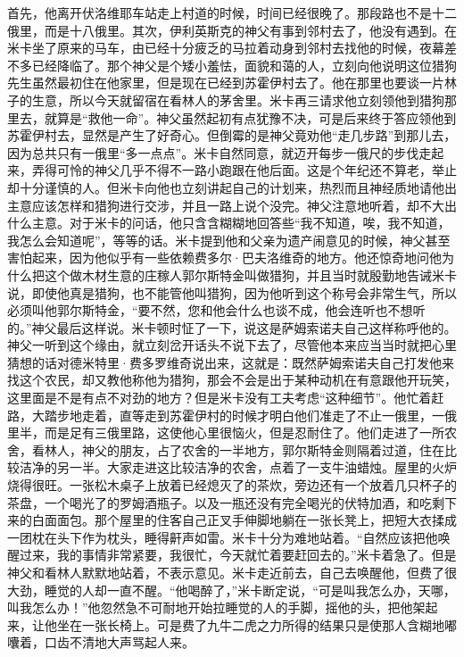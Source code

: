 \par 首先，他离开伏洛维耶车站走上村道的时候，时间已经很晚了。那段路也不是十二俄里，而是十八俄里。其次，伊利英斯克的神父有事到邻村去了，他没有遇到。在米卡坐了原来的马车，由已经十分疲乏的马拉着动身到邻村去找他的时候，夜幕差不多已经降临了。那个神父是个矮小羞怯，面貌和蔼的人，立刻向他说明这位猎狗先生虽然最初住在他家里，但是现在已经到苏霍伊村去了。他在那里也要谈一片林子的生意，所以今天就留宿在看林人的茅舍里。米卡再三请求他立刻领他到猎狗那里去，就算是“救他一命”。神父虽然起初有点犹豫不决，可是后来终于答应领他到苏霍伊村去，显然是产生了好奇心。但倒霉的是神父竟劝他“走几步路”到那儿去，因为总共只有一俄里“多一点点”。米卡自然同意，就迈开每步一俄尺的步伐走起来，弄得可怜的神父几乎不得不一路小跑跟在他后面。这是个年纪还不算老，举止却十分谨慎的人。但米卡向他也立刻讲起自己的计划来，热烈而且神经质地请他出主意应该怎样和猎狗进行交涉，并且一路上说个没完。神父注意地听着，却不大出什么主意。对于米卡的问话，他只含含糊糊地回答些“我不知道，唉，我不知道，我怎么会知道呢”，等等的话。米卡提到他和父亲为遗产闹意见的时候，神父甚至害怕起来，因为他似乎有一些依赖费多尔·巴夫洛维奇的地方。他还惊奇地问他为什么把这个做木材生意的庄稼人郭尔斯特金叫做猎狗，并且当时就殷勤地告诫米卡说，即使他真是猎狗，也不能管他叫猎狗，因为他听到这个称号会非常生气，所以必须叫他郭尔斯特金，“要不然，您和他会什么也谈不成，他会连听也不想听的。”神父最后这样说。米卡顿时怔了一下，说这是萨姆索诺夫自己这样称呼他的。神父一听到这个缘由，就立刻岔开话头不说下去了，尽管他本来应当当时就把心里猜想的话对德米特里·费多罗维奇说出来，这就是：既然萨姆索诺夫自己打发他来找这个农民，却又教他称他为猎狗，那会不会是出于某种动机在有意跟他开玩笑，这里面是不是有点不对劲的地方？但是米卡没有工夫考虑“这种细节”。他忙着赶路，大踏步地走着，直等走到苏霍伊村的时候才明白他们准走了不止一俄里，一俄里半，而是足有三俄里路，这使他心里很恼火，但是忍耐住了。他们走进了一所农舍，看林人，神父的朋友，占了农舍的一半地方，郭尔斯特金则隔着过道，住在比较洁净的另一半。大家走进这比较洁净的农舍，点着了一支牛油蜡烛。屋里的火炉烧得很旺。一张松木桌子上放着已经熄灭了的茶炊，旁边还有一个放着几只杯子的茶盘，一个喝光了的罗姆酒瓶子。以及一瓶还没有完全喝光的伏特加酒，和吃剩下来的白面面包。那个屋里的住客自己正叉手伸脚地躺在一张长凳上，把短大衣揉成一团枕在头下作为枕头，睡得鼾声如雷。米卡十分为难地站着。“自然应该把他唤醒过来，我的事情非常紧要，我很忙，今天就忙着要赶回去的。”米卡着急了。但是神父和看林人默默地站着，不表示意见。米卡走近前去，自己去唤醒他，但费了很大劲，睡觉的人却一直不醒。“他喝醉了，”米卡断定说，“可是叫我怎么办，天哪，叫我怎么办！”他忽然急不可耐地开始拉睡觉的人的手脚，摇他的头，把他架起来，让他坐在一张长椅上。可是费了九牛二虎之力所得的结果只是使那人含糊地嘟囔着，口齿不清地大声骂起人来。

